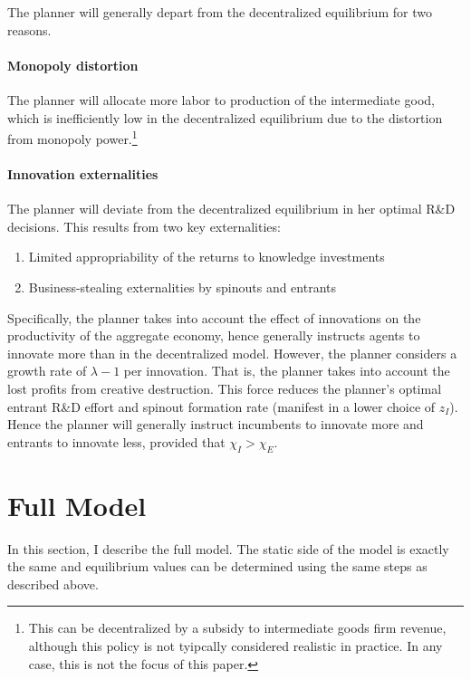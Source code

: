 \documentclass[11pt,english]{article}
\theoremstyle{remark}
\begin{document}
The planner will generally depart from the decentralized equilibrium for two reasons.

\paragraph{Monopoly distortion}
The planner will allocate more labor to production of the intermediate good, which is inefficiently low in the decentralized equilibrium due to the distortion from monopoly power.\footnote{This can be decentralized by a subsidy to intermediate goods firm revenue, although this policy is not tyipcally considered realistic in practice. In any case, this is not the focus of this paper.} 

\paragraph{Innovation externalities}

The planner will deviate from the decentralized equilibrium in her optimal R\&D decisions. This results from two key externalities: 
\begin{enumerate}
	\item Limited appropriability of the returns to knowledge investments
	\item Business-stealing externalities by spinouts and entrants
\end{enumerate}

Specifically, the planner takes into account the effect of innovations on the productivity of the aggregate economy, hence generally instructs agents to innovate more than in the decentralized model. However, the planner considers a growth rate of $\lambda - 1$ per innovation. That is, the planner takes into account the lost profits from creative destruction. This force reduces the planner's optimal entrant R\&D effort and spinout formation rate (manifest in a lower choice of $z_I$). Hence the planner will generally instruct incumbents to innovate more and entrants to innovate less, provided that $\chi_I > \chi_E$. 

\section{Full Model}\label{full_model}

In this section, I describe the full model. The static side of the model is exactly the same and equilibrium values can be determined using the same steps as described above.
\end{document}
